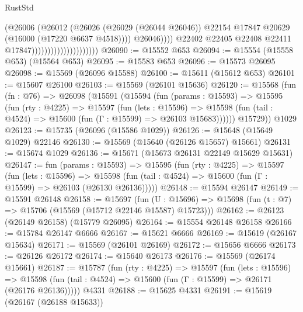 \begin{lexlean}{RustStd}
\begin{coremodule}
                                                    (@26006
                                                      (@26012
                                                        (@26026
                                                          (@26029 (@26044 @26046))
                                                          @22154
                                                          @17847
                                                          @20629
                                                          (@16000 (@17220 @6637 @4518))))
                                                      @26046))))
                                              @22402
                                              @22405
                                              @22408
                                              @22411
                                              @17847)))))))))))))))))))))
@26090 := @15552 @653
@26094 := @15554 (@15558 @653) (@15564 @653)
@26095 := @15583 @653
@26096 := @15573 @26095
@26098 := @15569 (@26096 @15588)
@26100 := @15611 (@15612 @653)
@26101 := @15607 @26100
@26103 := @15569 (@26101 @15636)
@26120 := @15568
    (fun (fn : @76) =>
    @26098
      (@15591
        (@15594
          (fun (params : @15593) =>
          @15595
            (fun (rty : @4225) =>
            @15597
              (fun (lets : @15596) =>
              @15598 (fun (tail : @4524) => @15600 (fun (Γ : @15599) => @26103 @15683))))))
        @15729))
    @1029
@26123 := @15735 (@26096 (@15586 @1029))
@26126 := @15648 (@15649 @1029) @22146
@26130 := @15569 (@15640 (@26126 @15657) @15661)
@26131 := @15674 @1029
@26136 := @15671 (@15673 @26131 @22149 @15629 @15631)
@26147 := fun (params : @15593) =>
  @15595
    (fun (rty : @4225) =>
    @15597
      (fun (lets : @15596) =>
      @15598 (fun (tail : @4524) => @15600 (fun (Γ : @15599) => @26103 (@26130 @26136)))))
@26148 := @15594 @26147
@26149 := @15591 @26148
@26158 := @15697
    (fun (U : @15696) => @15698 (fun (t : @7) => @15706 (@15569 (@15712 @22146 @15587) @15723)))
@26162 := @26123 (@26149 @26158) (@15779 @26095)
@26164 := @15554 @26148 @26158
@26166 := @15784 @26147 @6666
@26167 := @15621 @6666
@26169 := @15619 (@26167 @15634)
@26171 := @15569 (@26101 @26169)
@26172 := @15656 @6666
@26173 := @26126 @26172
@26174 := @15640 @26173
@26176 := @15569 (@26174 @15661)
@26187 := @15787
    (fun (rty : @4225) =>
    @15597
      (fun (lets : @15596) =>
      @15598 (fun (tail : @4524) => @15600 (fun (Γ : @15599) => @26171 (@26176 @26136)))))
    @4331
@26188 := @15625 @4331
@26191 := @15619 (@26167 (@26188 @15633))

\end{coremodule}
\end{lexlean}
